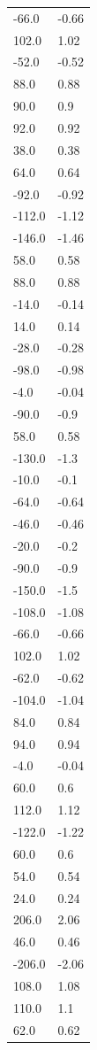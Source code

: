 \begin{longtable}{ll}
-66.0 & -0.66 \\
102.0 & 1.02 \\
-52.0 & -0.52 \\
88.0 & 0.88 \\
90.0 & 0.9 \\
92.0 & 0.92 \\
38.0 & 0.38 \\
64.0 & 0.64 \\
-92.0 & -0.92 \\
-112.0 & -1.12 \\
-146.0 & -1.46 \\
58.0 & 0.58 \\
88.0 & 0.88 \\
-14.0 & -0.14 \\
14.0 & 0.14 \\
-28.0 & -0.28 \\
-98.0 & -0.98 \\
-4.0 & -0.04 \\
-90.0 & -0.9 \\
58.0 & 0.58 \\
-130.0 & -1.3 \\
-10.0 & -0.1 \\
-64.0 & -0.64 \\
-46.0 & -0.46 \\
-20.0 & -0.2 \\
-90.0 & -0.9 \\
-150.0 & -1.5 \\
-108.0 & -1.08 \\
-66.0 & -0.66 \\
102.0 & 1.02 \\
-62.0 & -0.62 \\
-104.0 & -1.04 \\
84.0 & 0.84 \\
94.0 & 0.94 \\
-4.0 & -0.04 \\
60.0 & 0.6 \\
112.0 & 1.12 \\
-122.0 & -1.22 \\
60.0 & 0.6 \\
54.0 & 0.54 \\
24.0 & 0.24 \\
206.0 & 2.06 \\
46.0 & 0.46 \\
-206.0 & -2.06 \\
108.0 & 1.08 \\
110.0 & 1.1 \\
62.0 & 0.62 \\

\end{longtable}
